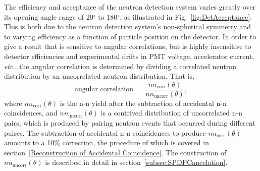 
The efficiency and acceptance of the neutron detection system varies greatly over its opening angle range of 20$^{\circ}$ to 180$^{\circ}$, as illustrated in Fig.~\ref{fig:DetAcceptance}.
This is both due to the neutron detection system's non-spherical symmetry and to varying efficiency as a function of particle position on the detector.
In order to give a result that is sensitive to angular correlations, but is highly insensitive to detector efficiencies and experimental drifts in PMT voltage, accelerator current, \emph{etc}., the angular correlation is determined by dividing a correlated neutron distribution by an uncorrelated neutron distribution.
That is,
\begin{equation}
\label{eq:angularCorr}
\text{angular correlation }  = \frac{nn_{\text{corr}}(\theta)}{nn_{\text{uncorr}}(\theta)},
\end{equation}
where $nn_{\text{corr}}(\theta)$ is the n-n yield after the subtraction of accidental n-n coincidences, and $nn_{\text{uncorr}}(\theta)$ is a contrived distribution of uncorrelated n-n pairs, which is produced by pairing neutron events that occurred during different pulses.
The subtraction of accidental n-n coincidences to produce $nn_{\text{corr}}(\theta)$ amounts to a 10\% correction, the procedure of which is covered in section~\ref{Reconstruction of Accidental Coincidence}. The construction of $nn_{\text{uncorr}}(\theta)$ is described in detail in section~\ref{subsec:SPDPCancelation}.


